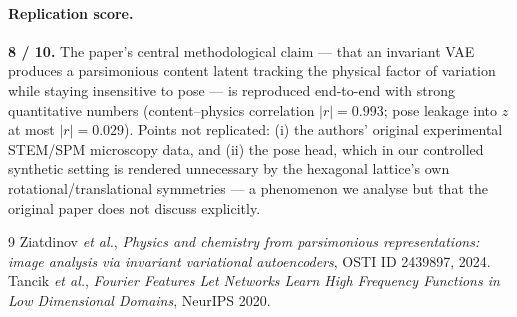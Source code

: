 \documentclass[11pt]{article}
\begin{document}
\paragraph{Replication score.} \textbf{8 / 10.}
The paper's central methodological claim --- that an invariant VAE
produces a parsimonious content latent tracking the physical factor
of variation while staying insensitive to pose --- is reproduced
end-to-end with strong quantitative numbers (content--physics
correlation $|r|=0.993$; pose leakage into $z$ at most $|r|=0.029$).
Points not replicated: (i) the authors' original experimental
STEM/SPM microscopy data, and (ii) the pose head, which in our
controlled synthetic setting is rendered unnecessary by the
hexagonal lattice's own rotational/translational symmetries --- a
phenomenon we analyse but that the original paper does not discuss
explicitly.

\begin{thebibliography}{9}
  Ziatdinov \emph{et al.},
  \emph{Physics and chemistry from parsimonious representations:
        image analysis via invariant variational autoencoders},
  OSTI ID 2439897, 2024.
  Tancik \emph{et al.},
  \emph{Fourier Features Let Networks Learn High Frequency Functions
        in Low Dimensional Domains}, NeurIPS 2020.
\end{thebibliography}
\end{document}
